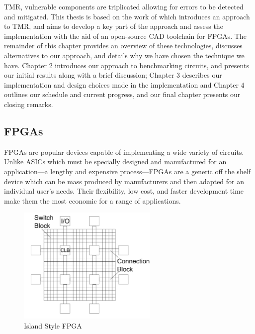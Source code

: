 \documentclass[12pt,final,oneside]{dwThesis} %
\begin{document}
   \gls{TMR}, vulnerable components are triplicated allowing for errors to be
   detected and mitigated. This thesis is based on the work
   of\cite{DiesselChange} which introduces an approach to \gls{TMR}, and aims
   to develop a key part of the approach and assess the implementation with the
   aid of an open-source \gls{CAD} toolchain for \glspl{FPGA}.
    The remainder of this chapter provides an overview of
   these technologies, discusses alternatives to our approach, and details why
   we have chosen the technique we have. Chapter 2 introduces our approach to
   benchmarking circuits, and presents our initial results along with a brief
   discussion; Chapter 3 describes our implementation and design choices made
   in the implementation and Chapter 4 outlines our schedule and current
   progress, and our final chapter presents our closing remarks.  \glsresetall
    \subsection{\glspl{FPGA}} \glspl{FPGA} are popular devices
   capable of implementing a wide variety of circuits. Unlike \glspl{ASIC}
   which must be specially designed and manufactured for an application---a
   lengthy and expensive process---\glspl{FPGA} are a generic off the shelf
   device which can be mass produced by manufacturers and then adapted for an
   individual user's needs. Their flexibility, low cost, and faster development
   time make them the most economic for a range of applications.


    \begin{figure} \begin{center}
         \includegraphics[width=0.6\textwidth]{images/ArchFull.pdf}
         \caption{Island Style FPGA} \label{FPGAArch} \end{center} \end{figure}
\end{document}

